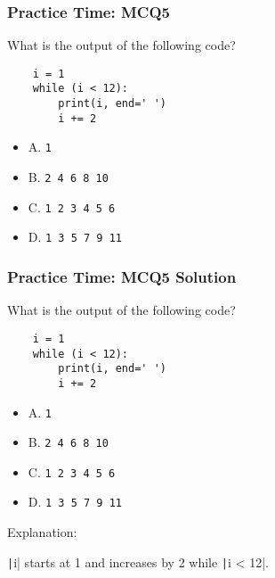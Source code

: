 \documentclass{beamer}
\begin{document}
\begin{frame}[fragile]
    \frametitle{Practice Time: MCQ5}
    What is the output of the following code?
    \begin{verbatim}
    i = 1
    while (i < 12):
        print(i, end=' ')
        i += 2
    \end{verbatim}
    \begin{itemize}
        \item A. \texttt{1}
        \item B. \texttt{2 4 6 8 10}
        \item C. \texttt{1 2 3 4 5 6}
        \item D. \texttt{1 3 5 7 9 11}
    \end{itemize}
\end{frame}
\begin{frame}[fragile]
    \frametitle{Practice Time: MCQ5 Solution}
    What is the output of the following code?
    \begin{verbatim}
    i = 1
    while (i < 12):
        print(i, end=' ')
        i += 2
    \end{verbatim}
    \begin{itemize}
        \item A. \texttt{1}
        \item B. \texttt{2 4 6 8 10}
        \item C. \texttt{1 2 3 4 5 6}
        \item \alert{D. \texttt{1 3 5 7 9 11}}
    \end{itemize}

    Explanation:

    \texttt|i| starts at 1
    and increases by 2 while \texttt|i < 12|.
\end{frame}
\end{document}
